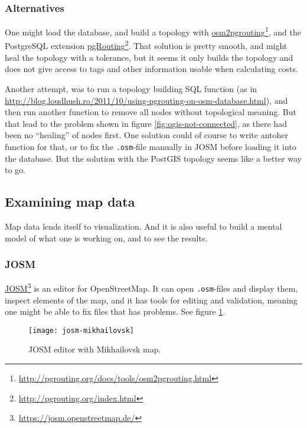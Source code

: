 \documentclass[../main.tex]{subfiles}
\begin{document}
\subsubsection{Alternatives}
One might load the database, and build a topology with \href{http://pgrouting.org/docs/tools/osm2pgrouting.html}{osm2pgrouting}\footnote{\url{http://pgrouting.org/docs/tools/osm2pgrouting.html}}, and the PostgreSQL extension \href{http://pgrouting.org/index.html}{pgRouting}\footnote{\url{http://pgrouting.org/index.html}}. That solution is pretty smooth, and might heal the topology with a tolerance, but it seems it only builds the topology and does not give access to tags and other information usable when calculating costs.

Another attempt, was to run a topology building SQL function (as in \url{http://blog.loudhush.ro/2011/10/using-pgrouting-on-osm-database.html}), and then run another function to remove all nodes without topological meaning. But that lead to the problem shown in figure \ref{fig:qgis-not-connected}, as there had been no ``healing'' of nodes first. One solution could of course to write antoher function for that, or to fix the \texttt{.osm}-file manually in JOSM before loading it into the database. But the solution with the PostGIS topology seems like a better way to go.

\subsection{Examining map data}
Map data lends itself to visualization. And it is also useful to build a mental model of what one is working on, and to see the results.

\subsubsection{JOSM}
\href{https://josm.openstreetmap.de/}{JOSM}\footnote{\url{https://josm.openstreetmap.de/}} is an editor for OpenStreetMap. It can open \texttt{.osm}-files and display them, inspect elements of the map, and it has tools for editing and validation, meaning one might be able to fix files that has problems. See figure \ref{fig:josm-mikhailovsk}.

\begin{figure}[h]
    \centering
    \texttt{[image: josm-mikhailovsk]}
    \caption{JOSM editor with Mikhailovsk map.}
    \label{fig:josm-mikhailovsk}
\end{figure}
\end{document}
